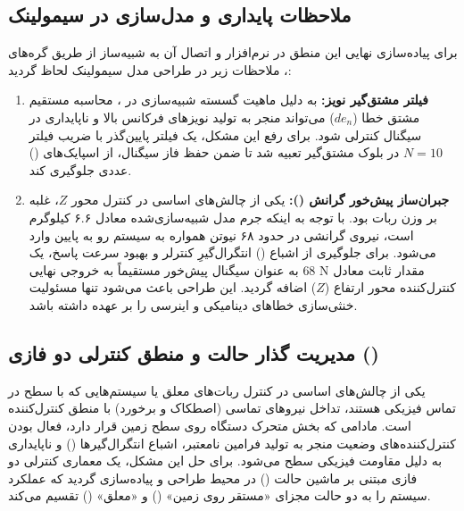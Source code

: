 	\subsection{ملاحظات پایداری و مدل‌سازی در سیمولینک}
	\label{subsec:method-simulink}
	برای پیاده‌سازی نهایی این منطق در نرم‌افزار  و اتصال آن به شبیه‌ساز از طریق گره‌های ، ملاحظات زیر در طراحی مدل سیمولینک لحاظ گردید:
	
	\begin{enumerate}
		\item \textbf{فیلتر مشتق‌گیر نویز:} به دلیل ماهیت گسسته شبیه‌سازی در ، محاسبه مستقیم مشتق خطا ($de_n$) می‌تواند منجر به تولید نویزهای فرکانس بالا و ناپایداری در سیگنال کنترلی شود. برای رفع این مشکل، یک فیلتر پایین‌گذر با ضریب فیلتر $N=10$ در بلوک مشتق‌گیر تعبیه شد تا ضمن حفظ فاز سیگنال، از اسپایک‌های () عددی جلوگیری کند.
		
		\item \textbf{جبران‌ساز پیش‌خور گرانش ():} یکی از چالش‌های اساسی در کنترل محور $Z$، غلبه بر وزن ربات بود. با توجه به اینکه جرم مدل شبیه‌سازی‌شده معادل ۶.۶ کیلوگرم است، نیروی گرانشی در حدود ۶۸ نیوتن همواره به سیستم رو به پایین وارد می‌شود. برای جلوگیری از اشباع () انتگرال‌گیرِ کنترلر و بهبود سرعت پاسخ، یک مقدار ثابت معادل $68\text{ N}$ به عنوان سیگنال پیش‌خور مستقیماً به خروجی نهایی کنترل‌کننده محور ارتفاع ($Z$) اضافه گردید. این طراحی باعث می‌شود  تنها مسئولیت خنثی‌سازی خطاهای دینامیکی و اینرسی را بر عهده داشته باشد.
	\end{enumerate}
	
	\subsection{مدیریت گذار حالت و منطق کنترلی دو فازی ()}
	\label{subsec:method-state-machine}
	
	یکی از چالش‌های اساسی در کنترل ربات‌های معلق یا سیستم‌هایی که با سطح در تماس فیزیکی هستند، تداخل نیروهای تماسی (اصطکاک و برخورد) با منطق کنترل‌کننده است. مادامی که بخش متحرک دستگاه روی سطح زمین قرار دارد، فعال بودن کنترل‌کننده‌های وضعیت منجر به تولید فرامین نامعتبر، اشباع انتگرال‌گیرها () و ناپایداری به دلیل مقاومت فیزیکی سطح می‌شود. برای حل این مشکل، یک معماری کنترلی دو فازی مبتنی بر ماشین حالت () در محیط  طراحی و پیاده‌سازی گردید که عملکرد سیستم را به دو حالت مجزای «مستقر روی زمین» () و «معلق» () تقسیم می‌کند.
	
